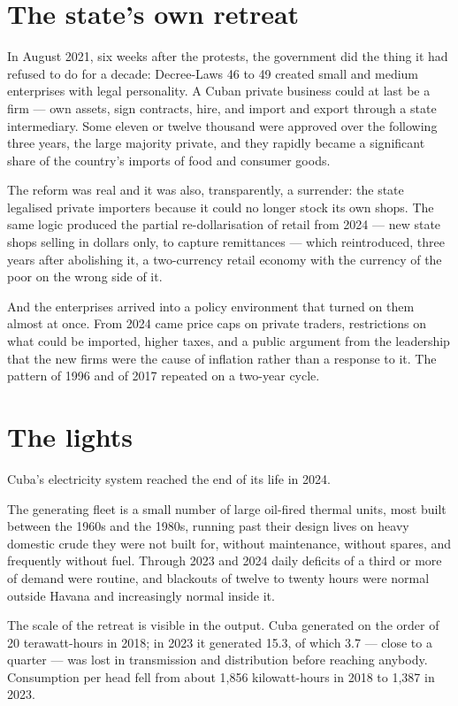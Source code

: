 \section{The state's own retreat}

In August 2021, six weeks after the protests, the government did the thing it
had refused to do for a decade: Decree-Laws 46 to 49 created small and medium
enterprises with legal personality. A Cuban private business could at last be a
firm --- own assets, sign contracts, hire, and import and export through a state
intermediary. Some eleven or twelve thousand were approved over the following
three years, the large majority private, and they rapidly became a significant
share of the country's imports of food and consumer goods.\unv{}

The reform was real and it was also, transparently, a surrender: the state
legalised private importers because it could no longer stock its own shops.
The same logic produced the partial re-dollarisation of retail from 2024 ---
new state shops selling in dollars only, to capture remittances --- which
reintroduced, three years after abolishing it, a two-currency retail economy
with the currency of the poor on the wrong side of it.

And the enterprises arrived into a policy environment that turned on them
almost at once. From 2024 came price caps on private traders, restrictions on
what could be imported, higher taxes, and a public argument from the leadership
that the new firms were the cause of inflation rather than a response to it. The
pattern of 1996 and of 2017 repeated on a two-year cycle.

\section{The lights}

Cuba's electricity system reached the end of its life in 2024.

The generating fleet is a small number of large oil-fired thermal units, most
built between the 1960s and the 1980s, running past their design lives on heavy
domestic crude they were not built for, without maintenance, without spares, and
frequently without fuel. Through 2023 and 2024 daily deficits of a third or more
of demand were routine, and blackouts of twelve to twenty hours were normal
outside Havana and increasingly normal inside it.

The scale of the retreat is visible in the output. Cuba generated on the order
of 20 terawatt-hours in 2018; in 2023 it generated 15.3, of which 3.7 --- close
to a quarter --- was lost in transmission and distribution before reaching
anybody.\unv{} Consumption per head fell from about 1,856 kilowatt-hours in
2018 to 1,387 in 2023.

